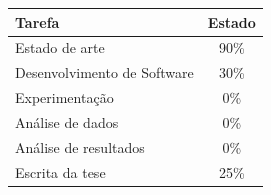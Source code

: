 \begin{center}
\begin{tabular}{| l | c |}
  \hline
  \textbf{Tarefa} & \textbf{Estado} \\
  \hline
  Estado de arte & 90\%  \\
  \hline
  Desenvolvimento de Software & 30\%  \\
  \hline
  Experimentação & 0\%  \\
  \hline
  Análise de dados & 0\% \\
  \hline
  Análise de resultados & 0\% \\ 
  \hline
  Escrita da tese & 25\% \\
  \hline
\end{tabular}
\end{center}




